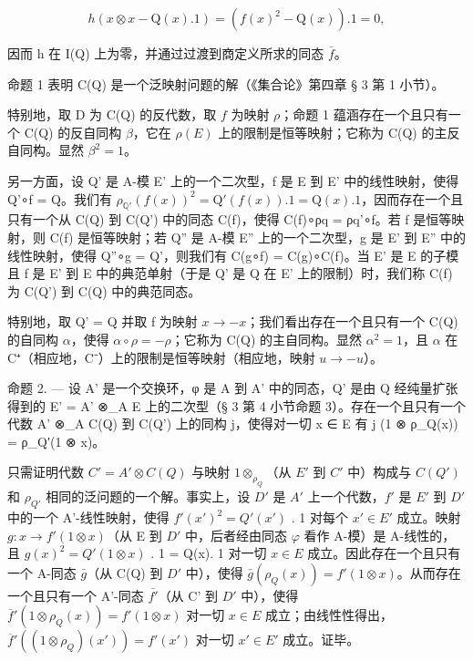 \[
h (x \otimes x - \mathrm{Q} (x). 1) = (f (x) ^ {2} - \mathrm{Q} (x)). 1 = 0,
\]

  因而 h 在 I(Q) 上为零，并通过过渡到商定义所求的同态 \(\bar{f}\)。

  命题 1 表明 C(Q) 是一个泛映射问题的解（《集合论》第四章 § 3 第 1 小节）。

  特别地，取 D 为 C(Q) 的反代数，取 \(f\) 为映射 \(\rho\)；命题 1 蕴涵存在一个且只有一个 C(Q) 的反自同构 \(\beta\)，它在 \(\rho(E)\) 上的限制是恒等映射；它称为 C(Q) 的主反自同构。显然 \(\beta^{2} = 1\)。

  另一方面，设 Q' 是 A-模 E' 上的一个二次型，f 是 E 到 E' 中的线性映射，使得 Q'∘f = Q。我们有 \(\rho_{\mathbb{Q}'}(f(x))^{2} = \mathrm{Q}'(f(x)).1 = \mathrm{Q}(x).1\)，因而存在一个且只有一个从 C(Q) 到 C(Q') 中的同态 C(f)，使得 C(f)∘ρq = ρq'∘f。若 f 是恒等映射，则 C(f) 是恒等映射；若 Q'' 是 A-模 E'' 上的一个二次型，g 是 E' 到 E'' 中的线性映射，使得 Q''∘g = Q'，则我们有 C(g∘f) = C(g)∘C(f)。当 E' 是 E 的子模且 f 是 E' 到 E 中的典范单射（于是 Q' 是 Q 在 E' 上的限制）时，我们称 C(f) 为 C(Q') 到 C(Q) 中的典范同态。

  特别地，取 Q' = Q 并取 f 为映射 \(x \to -x\)；我们看出存在一个且只有一个 C(Q) 的自同构 \(\alpha\)，使得 \(\alpha \circ \rho = -\rho\)；它称为 C(Q) 的主自同构。显然 \(\alpha^{2} = 1\)，且 \(\alpha\) 在 C⁺（相应地，C⁻）上的限制是恒等映射（相应地，映射 \(u \to -u\)）。

命题 2. --- 设 A' 是一个交换环，φ 是 A 到 A' 中的同态，Q' 是由 Q 经纯量扩张得到的 E' = A' ⊗\_A E 上的二次型（§ 3 第 4 小节命题 3）。存在一个且只有一个代数 A' ⊗\_A C(Q) 到 C(Q') 上的同构 j，使得对一切 x ∈ E 有 j (1 ⊗ ρ\_Q(x)) = ρ\_Q′(1 ⊗ x)。

  只需证明代数 \(C' = A' \otimes C(Q)\) 与映射 \(1 \otimes_{\rho_{Q}}\)（从 \(E'\) 到 \(C'\) 中）构成与 \(C(Q')\) 和 \(\rho_{Q'}\) 相同的泛问题的一个解。事实上，设 \(D'\) 是 \(A'\) 上一个代数，\(f'\) 是 \(E'\) 到 \(D'\) 中的一个 A'-线性映射，使得 \(f'(x')^{2} = Q'(x')\) . 1 对每个 \(x' \in E'\) 成立。映射 \(g : x \to f'(1 \otimes x)\)（从 E 到 \(D'\) 中，后者经由同态 \(\varphi\) 看作 A-模）是 A-线性的，且 \(g(x)^{2} = Q'(1 \otimes x)\) . 1 = Q(x). 1 对一切 \(x \in E\) 成立。因此存在一个且只有一个 A-同态 \(\bar{g}\)（从 C(Q) 到 \(D'\) 中），使得 \(\bar{g}(\rho_{Q}(x)) = f'(1 \otimes x)\)。从而存在一个且只有一个 A'-同态 \(\overline{f'}\)（从 C' 到 \(D'\) 中），使得 \(\overline{f}'(1 \otimes \rho_{Q}(x)) = f'(1 \otimes x)\) 对一切 \(x \in E\) 成立；由线性性得出，\(\overline{f}'((1 \otimes \rho_{Q})(x')) = f'(x')\) 对一切 \(x' \in E'\) 成立。证毕。


